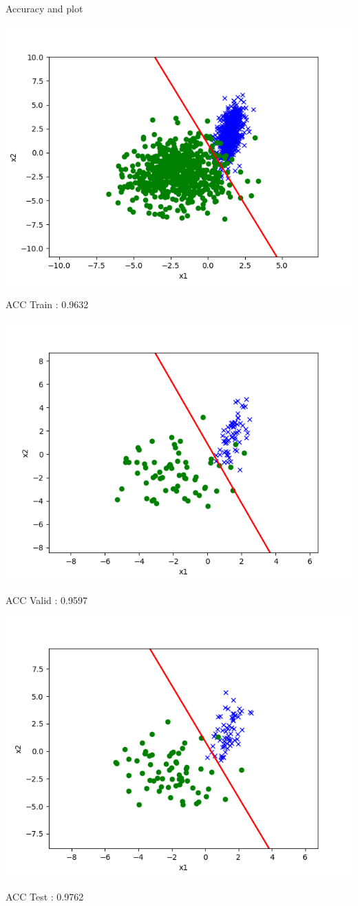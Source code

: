 \begin{answer}
Accuracy and plot

\includegraphics[width=1\textwidth]{posonly/posonly_true_plot_train.png}

ACC Train : 0.9632

\includegraphics[width=1\textwidth]{posonly/posonly_true_plot_valid.png}

ACC Valid : 0.9597

\includegraphics[width=1\textwidth]{posonly/posonly_true_plot_test.png}

ACC Test  : 0.9762

\end{answer}
